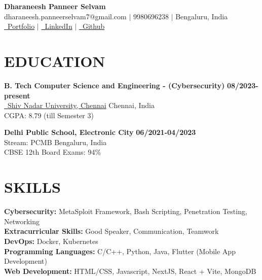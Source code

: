 \documentclass[10pt, letterpaper]{article} %
\begin{document}
\RaggedRight %

{\Large\bfseries Dharaneesh Panneer Selvam} \\
\vspace{0.1em} %
dharaneesh.panneerselvam7@gmail.com $|$ 9980696238 $|$ Bengaluru, India \\
\href{https://dharaneesh-p.vercel.app/}{\faLink\ Portfolio} $|$ \href{https://linkedin.com/in/dharaneesh-panneer-selvam}{\faLinkedin\ LinkedIn} $|$ \href{https://github.com/Apex077}{\faGithub\ Github} \\
\vspace{0.1em} %

\section*{EDUCATION}
\textbf{B. Tech Computer Science and Engineering - (Cybersecurity)} \hfill \textbf{08/2023-present} \\
\href{https://www.snuchennai.edu.in/}{\faLink\ Shiv Nadar University, Chennai} \hfill Chennai, India \\
CGPA: 8.79 (till Semester 3)

\textbf{Delhi Public School, Electronic City} \hfill \textbf{06/2021-04/2023} \\
Stream: PCMB \hfill Bengaluru, India \\
CBSE 12th Board Exams: 94\%

\section*{SKILLS}
\textbf{Cybersecurity:} MetaSploit Framework, Bash Scripting, Penetration Testing, Networking \\
\textbf{Extracurricular Skills:} Good Speaker, Communication, Teamwork \\
\textbf{DevOps:} Docker, Kubernetes \\
\textbf{Programming Languages:} C/C++, Python, Java, Flutter (Mobile App Development) \\
\textbf{Web Development:} HTML/CSS, Javascript, NextJS, React + Vite, MongoDB

\end{document}
